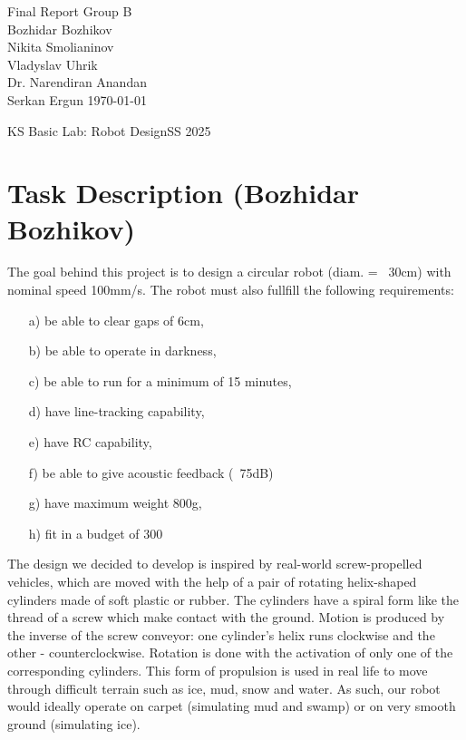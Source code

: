 \documentclass[12pt,a4paper,english]{article}
\begin{document}
\MTHeader                           %
{Final Report}                    %
{Group B \\}                           %
{Bozhidar Bozhikov \\ Nikita Smolianinov \\ Vladyslav Uhrik \\}
{Dr. Narendiran Anandan\\ Serkan Ergun}         %
{\today}                            %
%
\clearpage

\tableofcontents %
\clearpage
%
\pagestyle{plain}
%

\begin{center}
{KS Basic Lab: Robot Design\hfill SS 2025}\\[1.5ex]
\end{center}
\section{Task Description (Bozhidar Bozhikov)}

The goal behind this project is to design a circular robot (diam. = ~30cm) with nominal speed 100mm/s. The robot must also fullfill the following requirements: 

\begin{itemize}
  \item[a)] be able to clear gaps of 6cm,
  \item[b)] be able to operate in darkness,
 \item[c)] be able to run for a minimum of 15 minutes,
 \item[d)] have line-tracking capability,
 \item[e)] have RC capability,
 \item[f)] be able to give acoustic feedback (~75dB)
 \item[g)] have maximum weight 800g,
 \item[h)] fit in a budget of 300\EUR
\end{itemize}

The design we decided to develop is inspired by real-world screw-propelled vehicles, which are moved with the help of a pair of rotating helix-shaped cylinders made of soft plastic or rubber. The cylinders have a spiral form like the thread of a screw which make contact with the ground. Motion is produced by the inverse of the screw conveyor: one cylinder's helix runs clockwise and the other - counterclockwise. Rotation is done with the activation of only one of the corresponding cylinders. This form of propulsion is used in real life to move through difficult terrain such as ice, mud, snow and water. As such, our robot would ideally operate on carpet (simulating mud and swamp) or on very smooth ground (simulating ice). 
\end{document}
